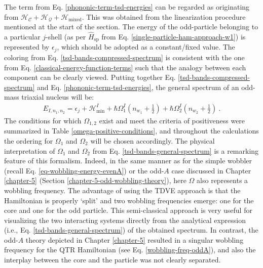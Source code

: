 The term from Eq. \ref{phononic-term-tsd-energies} can be regarded as originating from $\mathcal{H}_\mathscr{C}+\mathcal{H}_\mathcal{Q}+\mathcal{H}_\text{mixed}$. This was obtained from the linearization procedure mentioned at the start of the section. The energy of the odd-particle belonging to a particular $j$-shell (as per $\hat{H}_\text{sp}$ from Eq. \ref{single-particle-ham-approach-w1}) is represented by $\epsilon_j$, which should be adopted as a constant/fixed value. The coloring from Eq. \ref{tsd-bands-compressed-spectrum} is consistent with the one from Eq. \ref{classical-energy-function-terms} such that the analogy between each component can be clearly viewed. Putting together Eq. \ref{tsd-bands-compressed-spectrum} and Eq. \ref{phononic-term-tsd-energies}, the general spectrum of an odd-mass triaxial nucleus will be:
\begin{align}
    E_{I,n_1,n_2}=\epsilon_j+\mathcal{H}_\text{min}^I+\hbar\Omega_1^I\left(n_{w_1}+\frac{1}{2}\right)+\hbar\Omega_2^I\left(n_{w_2}+\frac{1}{2}\right)\ .
    \label{tsd-bands-general-spectrum}
\end{align}
The conditions for which $\Omega_{1,2}$ exist and meet the criteria of positiveness were summarized in Table \ref{omega-positive-conditions}, and throughout the calculations the ordering for $\Omega_1$ and $\Omega_2$ will be chosen accordingly. The physical interpretation of $\Omega_1$ and $\Omega_2$ from Eq. \ref{tsd-bands-general-spectrum} is a remarking feature of this formalism. Indeed, in the same manner as for the simple wobbler (recall Eq. \ref{eq-wobbling-energy-evenA}) or the odd-$A$ case discussed in Chapter \ref{chapter-5} (Section \ref{chapter-5-odd-wobbling-theory}), here $\Omega$ also represents a wobbling frequency. The advantage of using the TDVE approach is that the Hamiltonian is properly `split' and two wobbling frequencies emerge: one for the core and one for the odd particle. This semi-classical approach is very useful for visualizing the two interacting systems directly from the analytical expression (i.e., Eq. \ref{tsd-bands-general-spectrum}) of the obtained spectrum. In contrast, the odd-$A$ theory depicted in Chapter \ref{chapter-5} resulted in a singular wobbling frequency for the QTR Hamiltonian (see Eq. \ref{wobbling-freq-oddA}), and also the interplay between the core and the particle was not clearly separated.

